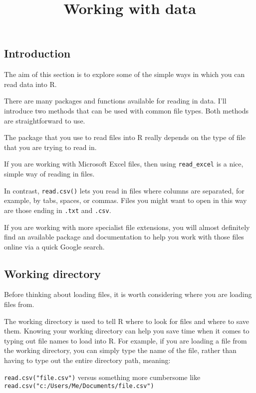 \documentclass[
]{article}
\title{Working with data}
\author{}
\date{\vspace{-2.5em}}
\begin{document}
\maketitle

\n
\n

\hypertarget{introduction}{%
\subsection{Introduction}\label{introduction}}

The aim of this section is to explore some of the simple ways in which
you can read data into R.

There are many packages and functions available for reading in data.
I'll introduce two methods that can be used with common file types. Both
methods are straightforward to use.

The package that you use to read files into R really depends on the type
of file that you are trying to read in.

If you are working with Microsoft Excel files, then using
\texttt{read\_excel} is a nice, simple way of reading in files.

In contrast, \texttt{read.csv()} lets you read in files where columns
are separated, for example, by tabs, spaces, or commas. Files you might
want to open in this way are those ending in \texttt{.txt} and
\texttt{.csv}.

If you are working with more specialist file extensions, you will almost
definitely find an available package and documentation to help you work
with those files online via a quick Google search.

\n
\n

\hypertarget{working-directory}{%
\subsection{Working directory}\label{working-directory}}

Before thinking about loading files, it is worth considering where you
are loading files from.

The working directory is used to tell R where to look for files and
where to save them. Knowing your working directory can help you save
time when it comes to typing out file names to load into R. For example,
if you are loading a file from the working directory, you can simply
type the name of the file, rather than having to type out the entire
directory path, meaning:

\texttt{read.csv("file.csv")} versus something more cumbersome like
\texttt{read.csv("c:/Users/Me/Documents/file.csv")}
\end{document}
